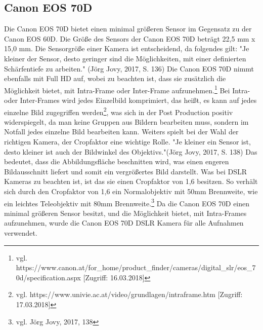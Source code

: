 \subsection{Canon EOS 70D}
Die Canon EOS 70D bietet einen minimal größeren Sensor im Gegensatz zu der Canon EOS 60D. Die Größe des Sensors der Canon EOS 70D beträgt 22,5 mm x 15,0 mm. Die Sensorgröße einer Kamera ist entscheidend, da folgendes gilt: "Je kleiner der Sensor, desto geringer sind die Möglichkeiten, mit einer definierten Schärfentiefe zu arbeiten." (Jörg Jovy, 2017, S. 136)\newline
Die Canon EOS 70D nimmt ebenfalls mit Full HD auf, wobei zu beachten ist, dass sie zusätzlich die Möglichkeit bietet, mit Intra-Frame oder Inter-Frame aufzunehmen.\footnote{\label{}vgl. https://www.canon.at/for\_home/product\_finder/cameras/digital\_slr/eos\_70d/specification.aspx [Zugriff: 16.03.2018]} Bei Intra- oder Inter-Frames wird jedes Einzelbild komprimiert, das heißt, es kann auf jedes einzelne Bild zugegriffen werden\footnote{\label{}vgl. https://www.univie.ac.at/video/grundlagen/intraframe.htm [Zugriff: 17.03.2018]}, was sich in der Post Production positiv widerspiegelt, da man keine Gruppen aus Bildern bearbeiten muss, sondern im Notfall jedes einzelne Bild bearbeiten kann. Weiters spielt bei der Wahl der richtigen Kamera, der Cropfaktor eine wichtige Rolle. "Je kleiner ein Sensor ist, desto kleiner ist auch der Bildwinkel des Objektivs."(Jörg Jovy, 2017, S. 138)\newline
Das bedeutet, dass die Abbildungsfläche beschnitten wird, was einen engeren Bildausschnitt liefert und somit ein vergrößertes Bild darstellt. Was bei DSLR Kameras zu beachten ist, ist das sie einen Cropfaktor von 1,6 besitzen. So verhält sich durch den Cropfaktor von 1,6 ein Normalobjektiv mit 50mm Brennweite, wie ein leichtes Teleobjektiv mit 80mm Brennweite.\footnote{\label{}vgl. Jörg Jovy, 2017, 138}
Da die Canon EOS 70D einen minimal größeren Sensor besitzt, und die Möglichkeit bietet, mit Intra-Frames aufzunehmen, wurde die Canon EOS 70D DSLR Kamera für alle Aufnahmen verwendet.
